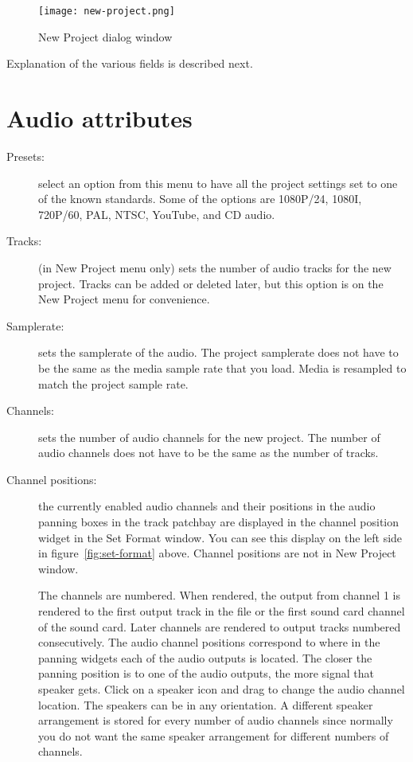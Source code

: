 \begin{figure}[htpb]
	\centering
	\texttt{[image: new-project.png]}
	\caption{New Project dialog window}
	\label{fig:new-project}
\end{figure}

Explanation of the various fields is described next.

\section{Audio attributes}%
\label{sec:audio_attributes}


\begin{description}
            \item[Presets:]
            select an option from this menu to have all the project settings set to one of the known standards.  Some of the options are 1080P/24, 1080I, 720P/60, PAL, NTSC, YouTube, and CD audio.
            
            \item[Tracks:]
            (in New Project menu only) sets the number of audio tracks for the new project. Tracks can be added or deleted later, but this option is on the New Project menu for convenience.
            
            \item[Samplerate:]
            sets the samplerate of the audio. The project samplerate does not have to be the same as the media sample rate that you load. Media is resampled to match the project sample rate.
            
            \item[Channels:]
            sets the number of audio channels for the new project. The number of audio channels does not have to be the same as the number of tracks.
            
            \item[Channel positions:]
            the currently enabled audio channels and their positions in the audio panning boxes in the track patchbay are displayed in the channel position widget in the Set Format window.  
            You can see this display on the left side in figure~\ref{fig:set-format} above. 
            Channel positions are not in New Project window.
            
            The channels are numbered. 
            When rendered, the output from channel 1 is rendered to the first output track in the file or the first sound card channel of the sound card. 
            Later channels are rendered to output tracks numbered consecutively. 
            The audio channel positions correspond to where in the panning widgets each of the audio outputs is located. 
            The closer the panning position is to one of the audio outputs, the more signal that speaker gets. 
            Click on a speaker icon and drag to change the audio channel location. 
            The speakers can be in any orientation. 
            A different speaker arrangement is stored for every number of audio channels since normally you do not want the same speaker arrangement for different numbers of channels.
            

\end{description}
